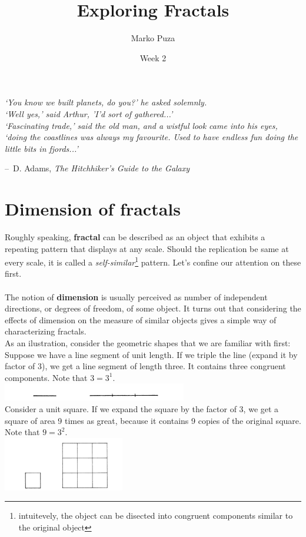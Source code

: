 \documentclass[12pt]{article}
\title{\textbf{Exploring Fractals}}
\date{Week 2}
\author{Marko Puza\\}
\makeatletter
\newenvironment{chapquote}[2][2em]
  {\setlength{\@tempdima}{#1}%
   \def\chapquote@author{#2}%
   \parshape 1 \@tempdima \dimexpr\textwidth-2\@tempdima\relax%
   \itshape}
  {\par\normalfont\hfill--\ \chapquote@author\hspace*{\@tempdima}\par\bigskip}
\makeatother
\begin{document}
\maketitle

\begin{chapquote}{D. Adams, \textit{The Hitchhiker's Guide to the Galaxy}}
\noindent `You know we built planets, do you?' he asked solemnly. \\
`Well yes,' said Arthur, 'I'd sort of gathered...' \\
`Fascinating trade,' said the old man, and a wistful look came into his eyes, `doing the coastlines was always my favourite. Used to have endless fun doing the little bits in fjords...'
\end{chapquote}	

\section{Dimension of fractals}
Roughly speaking, \textbf{fractal} can be described as an object that exhibits a repeating pattern that displays at any scale. Should the replication be same at every scale, it is called a \emph{self-similar}\footnote{intuitevely, the object can be disected into congruent components similar to the original object} pattern. Let's confine our attention on these first.
\\\\
The notion of \textbf{dimension} is usually perceived as number of independent directions, or degrees of freedom, of some object. It turns out that considering the effects of dimension on the measure of similar objects gives a simple way of characterizing fractals. \\
As an ilustration, consider the geometric shapes that we are familiar with first:\\
Suppose we have a line segment of unit length. If we triple the line (expand it by factor of 3), we get a line segment of length three. It contains three congruent components. Note that $3 = 3^1$. \\
\includegraphics{unit_line} \\
Consider a unit square. If we expand the square by the factor of 3, we get a square of area 9 times as great, because it contains 9 copies of the original square. Note that $9 = 3^2$. \\
\includegraphics[width = 200px]{square} \\
\end{document}
